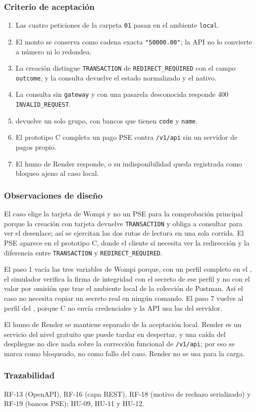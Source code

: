 \subsubsection{Criterio de aceptación}

\begin{enumerate}
  \item Las cuatro peticiones de la carpeta \texttt{01} pasan en el ambiente \texttt{local}.
  \item El monto se conserva como cadena exacta \texttt{"50000.00"}; la API no lo convierte a número ni lo redondea.
  \item La creación distingue \texttt{TRANSACTION} de \texttt{REDIRECT\_REQUIRED} con el campo \texttt{outcome}, y la consulta devuelve el estado normalizado y el nativo.
  \item La consulta sin \texttt{gateway} y con una pasarela desconocida responde 400 \texttt{INVALID\_REQUEST}.
  \item {} devuelve un solo grupo, con bancos que tienen \texttt{code} y \texttt{name}.
  \item El prototipo C completa un pago PSE contra \texttt{/v1/api} sin un servidor de pagos propio.
  \item El humo de Render responde, o su indisponibilidad queda registrada como bloqueo ajeno al caso local.
\end{enumerate}

\subsubsection{Observaciones de diseño}

El caso elige la tarjeta de Wompi y no un PSE para la comprobación principal porque la creación con tarjeta devuelve \texttt{TRANSACTION} y obliga a consultar para ver el desenlace; así se ejercitan las dos rutas de lectura en una sola corrida. El PSE aparece en el prototipo C, donde el cliente sí necesita ver la redirección y la diferencia entre \texttt{TRANSACTION} y \texttt{REDIRECT\_REQUIRED}.

El paso 1 vacía las tres variables de Wompi porque, con un perfil completo en el , el simulador verifica la firma de integridad con el secreto de ese perfil y no con el valor por omisión que trae el ambiente local de la colección de Postman. Así el caso no necesita copiar un secreto real en ningún comando. El paso 7 vuelve al perfil del , porque C no envía credenciales y la API usa las del servidor.

El humo de Render se mantiene separado de la aceptación local. Render es un servicio del nivel gratuito que puede tardar en despertar, y una caída del despliegue no dice nada sobre la corrección funcional de \texttt{/v1/api}; por eso se marca como bloqueado, no como fallo del caso. Render no se usa para la carga.

\subsubsection{Trazabilidad}

RF-13 (OpenAPI), RF-16 (capa REST), RF-18 (motivo de rechazo serializado) y RF-19 (bancos PSE); HU-09, HU-11 y HU-12.
